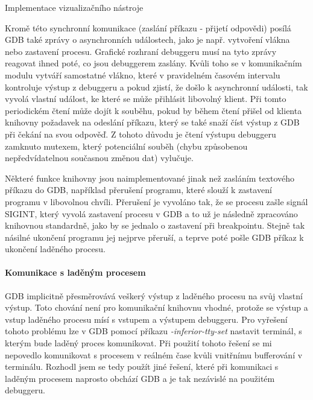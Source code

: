 \documentclass[czech,bachelor,male,python,dept460]{diploma}						%
\newcommand{\parspace}[1][]{
	\ifthenelse{\isempty{#1}}{\vspace{5mm}}{\vspace{#1}}
	\par
}
\begin{document}
\begin{section}{Implementace vizualizačního nástroje}
			\parspace Kromě této synchronní komunikace (zaslání příkazu - přijetí odpovědi) posílá GDB také zprávy o asynchronních událostech, jako je např.
			vytvoření vlákna nebo zastavení procesu. Grafické rozhraní debuggeru musí na tyto zprávy reagovat ihned poté, co jsou debuggerem zaslány.
			Kvůli toho se v komunikačním modulu vytváří samostatné vlákno, které v pravidelném časovém intervalu kontroluje výstup z debuggeru a pokud zjistí, že došlo
			k asynchronní události, tak vyvolá vlastní událost, ke které se může přihlásit libovolný klient. Při tomto periodickém čtení může dojít k souběhu, pokud
			by během čtení přišel od klienta knihovny požadavek na odeslání příkazu, který se také snaží číst výstup z GDB při čekání na svou odpověď.
			Z tohoto důvodu je čtení výstupu debuggeru zamknuto mutexem\cite[80]{tanenbaum}, který potenciální souběh (chybu způsobenou nepředvídatelnou
			současnou změnou dat) vylučuje.
			
			\parspace Některé funkce knihovny jsou naimplementované jinak než zasláním textového příkazu do GDB, například přerušení programu, které
			slouží k zastavení programu v libovolnou chvíli. Přerušení je vyvoláno tak, že se procesu zašle signál SIGINT, který vyvolá zastavení procesu v GDB a to
			už je následně zpracováno knihovnou standardně, jako by se jednalo o zastavení při breakpointu. Stejně tak násilné ukončení programu jej nejprve přeruší,
			a teprve poté pošle GDB příkaz k ukončení laděného procesu.
			
		\paragraph*{Komunikace s laděným procesem}
			GDB implicitně přesměrovává veškerý výstup z laděného procesu na svůj vlastní výstup. Toto chování není pro komunikační knihovnu vhodné,
			protože se výstup a vstup laděného procesu mísí s vstupem a výstupem debuggeru.
			Pro vyřešení tohoto problému lze v GDB pomocí příkazu \textit{-inferior-tty-set} nastavit terminál, s kterým bude laděný proces komunikovat.
			Při použití tohoto řešení se mi nepovedlo komunikovat s procesem v reálném čase kvůli vnitřnímu bufferování v terminálu.
			Rozhodl jsem se tedy použít jiné řešení, které při komunikaci s laděným procesem naprosto obchází GDB a je tak nezávislé na použitém debuggeru.
			

\end{section}
\end{document}
